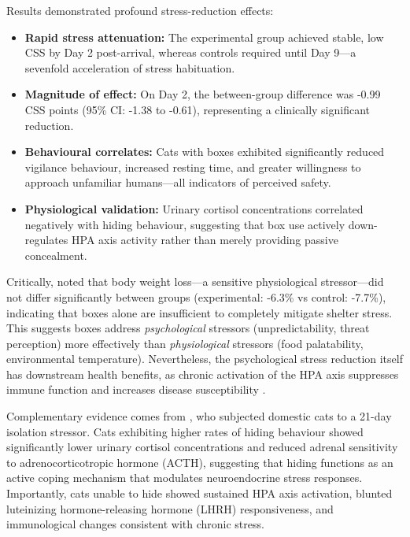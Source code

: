 \documentclass[12pt,a4paper]{article}
\begin{document}
Results demonstrated profound stress-reduction effects:

\begin{itemize}
    \item \textbf{Rapid stress attenuation:} The experimental group achieved stable, low CSS by Day 2 post-arrival, whereas controls required until Day 9—a sevenfold acceleration of stress habituation.
    
    \item \textbf{Magnitude of effect:} On Day 2, the between-group difference was -0.99 CSS points (95\% CI: -1.38 to -0.61), representing a clinically significant reduction.
    
    \item \textbf{Behavioural correlates:} Cats with boxes exhibited significantly reduced vigilance behaviour, increased resting time, and greater willingness to approach unfamiliar humans—all indicators of perceived safety.
    
    \item \textbf{Physiological validation:} Urinary cortisol concentrations correlated negatively with hiding behaviour, suggesting that box use actively down-regulates HPA axis activity rather than merely providing passive concealment.
\end{itemize}

Critically, \citet{vinke2014} noted that body weight loss—a sensitive physiological stressor—did not differ significantly between groups (experimental: -6.3\% vs control: -7.7\%), indicating that boxes alone are insufficient to completely mitigate shelter stress. This suggests boxes address \textit{psychological} stressors (unpredictability, threat perception) more effectively than \textit{physiological} stressors (food palatability, environmental temperature). Nevertheless, the psychological stress reduction itself has downstream health benefits, as chronic activation of the HPA axis suppresses immune function and increases disease susceptibility \citep{sapolsky2004}.

Complementary evidence comes from \citet{carlstead1993}, who subjected domestic cats to a 21-day isolation stressor. Cats exhibiting higher rates of hiding behaviour showed significantly lower urinary cortisol concentrations and reduced adrenal sensitivity to adrenocorticotropic hormone (ACTH), suggesting that hiding functions as an active coping mechanism that modulates neuroendocrine stress responses. Importantly, cats unable to hide showed sustained HPA axis activation, blunted luteinizing hormone-releasing hormone (LHRH) responsiveness, and immunological changes consistent with chronic stress.
\end{document}
